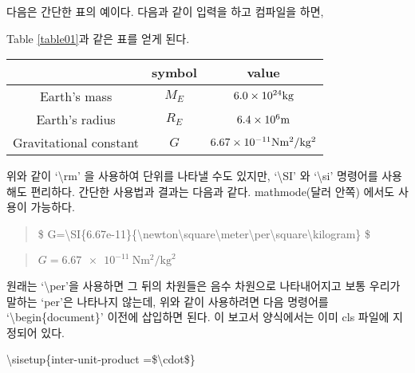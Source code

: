 \documentclass{gshs-report-v1.2}
\begin{document}
다음은 간단한 표의 예이다. 다음과 같이 입력을 하고 컴파일을 하면,

Table \ref{table01}과 같은 표를 얻게 된다.
\begin{table}[t]

	\begin{center}
		\begin{tabular}{c|c|c}
			\hline
			& symbol & value \\ \hline
			Earth's mass & $M_E$ & $6.0\times 10^{24} {\rm kg}$ \\
			Earth's radius & $R_E$ & $6.4\times 10^6 {\rm m}$ \\
			Gravitational constant & $G$ & $6.67\times 10^{-11} {\rm N m^2 /kg^2}$ \\ \hline
		\end{tabular}
	\end{center}
\end{table}

위와 같이 `\textbackslash rm' 을 사용하여 단위를 나타낼 수도 있지만,
`\textbackslash SI' 와 `\textbackslash si' 명령어를 사용해도 편리하다. 
간단한 사용법과 결과는 다음과 같다. mathmode(달러 안쪽) 에서도 사용이 가능하다.

\begin{center}
	\begin{quote}
		\$ G=\textbackslash SI\{6.67e-11\}\{\textbackslash newton\textbackslash square\textbackslash meter\textbackslash per\textbackslash square\textbackslash kilogram\} \$
	\end{quote}
	
	\begin{quote}
		$ G=\SI{6.67e-11}{\newton\square\meter\per\square\kilogram} $
	\end{quote}
\end{center}

원래는 `\textbackslash per'을 사용하면 그 뒤의 차원들은 음수 차원으로 나타내어지고 보통 우리가 말하는 `per'은 나타나지 않는데,
위와 같이 사용하려면 다음 명령어를 `\textbackslash begin\{document\}' 이전에 삽입하면 된다.
이 보고서 양식에서는 이미 cls 파일에 지정되어 있다. 
\begin{center}
	\textbackslash sisetup\{inter-unit-product =\$\textbackslash cdot\$\}
\end{center}


\end{document}
